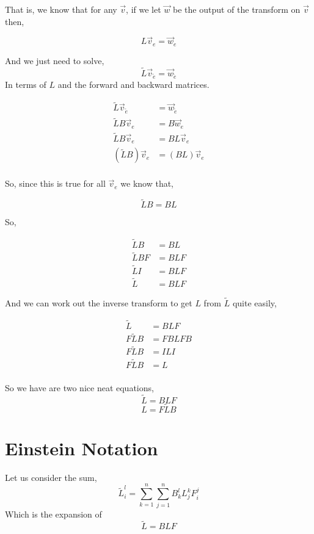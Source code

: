 \documentclass[12pt]{book}
\theoremstyle{plain}
\theoremstyle{definition}
\theoremstyle{ppart}
\theoremstyle{case}
\theoremstyle{solution}
\begin{document}
That is, we know that for any $\vec{v}$, if we let $\vec{w}$ be the output of the transform on $\vec{v}$ then,

\[L \vec{v}_e = \vec{w}_e \]

And we just need to solve,
\[\widetilde{L} \vec{v}_{\widetilde{e}} = \vec{w}_{\widetilde{e}} \]
In terms of $L$ and the forward and backward matrices.


\begin{align*}
  \widetilde{L} \vec{v}_{\widetilde{e}} &= \vec{w}_{\widetilde{e}} \\
  \widetilde{L} B \vec{v}_e &= B \vec{w}_e \\
  \widetilde{L} B \vec{v}_e &= B L \vec{v}_e \\
  (\widetilde{L} B) \vec{v}_e &= (B L) \vec{v}_e \\
\end{align*}

So, since this is true for all $\vec{v}_e$ we know that,

\[ \widetilde{L} B = B L \]

So,

\begin{align*}
  \widetilde{L} B &= B L \\
  \widetilde{L} B F &= B L F \\
  \widetilde{L} I &= B L F \\
  \widetilde{L} &= B L F
\end{align*}

And we can work out the inverse transform to get $L$ from $\widetilde{L}$ quite easily,

\begin{align*}
  \widetilde{L} &= B L F \\
  F \widetilde{L} B &= F B L F B\\
  F \widetilde{L} B &= I L I\\
  F \widetilde{L} B &= L \\
\end{align*}

So we have are two nice neat equations,
\label{linear_map_transforms}
\[ \widetilde{L} = B L F \]
\[ L = F \widetilde{L} B \]

\section{Einstein Notation}

Let us consider the sum,
\[ \widetilde{L}^l_i =  \sum_{k=1}^n \sum_{j=1}^n B^l_k L^k_j F^j_i \] 
Which is the expansion of
\[ \widetilde{L} = B L F \]
\end{document}
